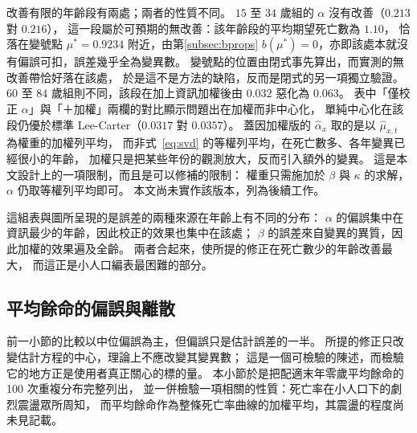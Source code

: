 \documentclass[UTF8, fontset=macnew, a4paper, 12pt]{ctexart}
\begin{document}
改善有限的年齡段有兩處；兩者的性質不同。
$15$ 至 $34$ 歲組的 $\alpha$ 沒有改善（$0.213$ 對 $0.216$），
這一段屬於可預期的無改善：該年齡段的平均期望死亡數為 $1.10$，
恰落在變號點 $\mu^{\ast}=0.9234$ 附近，由第\ref{subsec:bprops}
$b(\mu^{\ast})=0$，亦即該處本就沒有偏誤可扣，誤差幾乎全為變異數。
變號點的位置由閉式事先算出，而實測的無改善帶恰好落在該處，
於是這不是方法的缺陷，反而是閉式的另一項獨立驗證。
$60$ 至 $84$ 歲組則不同，該段在加上資訊加權後由 $0.032$ 惡化為 $0.063$。
表中「僅校正 $\alpha$」與「＋加權」兩欄的對比顯示問題出在加權而非中心化，
單純中心化在該段仍優於標準 Lee-Carter（$0.0317$ 對 $0.0357$）。
蓋因加權版的 $\hat\alpha_x$ 取的是以 $\hat\mu_{x,t}$ 為權重的加權列平均，
而非式~\eqref{eq:svd} 的等權列平均，在死亡數多、各年變異已經很小的年齡，
加權只是把某些年份的觀測放大，反而引入額外的變異。
這是本文設計上的一項限制，而且是可以修補的限制：
權重只需施加於 $\beta$ 與 $\kappa$ 的求解，$\alpha$ 仍取等權列平均即可。
本文尚未實作該版本，列為後續工作。

這組表與圖所呈現的是誤差的兩種來源在年齡上有不同的分布：
$\alpha$ 的偏誤集中在資訊最少的年齡，因此校正的效果也集中在該處；
$\beta$ 的誤差來自變異的異質，因此加權的效果遍及全齡。
兩者合起來，使所提的修正在死亡數少的年齡改善最大，
而這正是小人口編表最困難的部分。

\subsection{平均餘命的偏誤與離散}\label{sec:e0var}

前一小節的比較以中位偏誤為主，但偏誤只是估計誤差的一半。
所提的修正只改變估計方程的中心，理論上不應改變其變異數；
這是一個可檢驗的陳述，而檢驗它的地方正是使用者真正關心的標的量。
本小節於是把配適末年零歲平均餘命的 100 次重複分布完整列出，
並一併檢驗一項相關的性質：死亡率在小人口下的劇烈震盪眾所周知，
而平均餘命作為整條死亡率曲線的加權平均，其震盪的程度尚未見記載。
\end{document}
